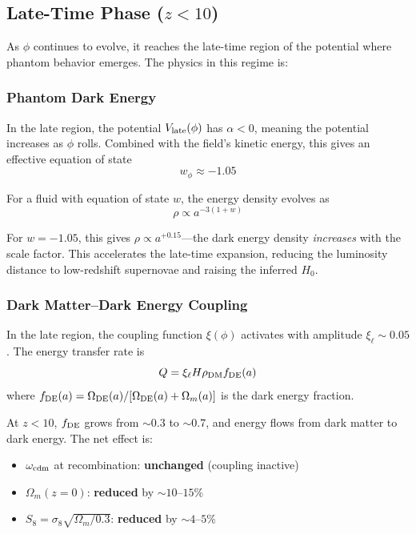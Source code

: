 \documentclass[twocolumn,showpacs,preprintnumbers,amsmath,amssymb,prd]{revtex4-2}
\begin{document}
\subsection{Late-Time Phase ($z < 10$)}

As $\phi$ continues to evolve, it reaches the late-time region of the potential where phantom behavior emerges. The physics in this regime is:

\subsubsection{Phantom Dark Energy}

In the late region, the potential $V_{\rm late}(\phi)$ has $\alpha < 0$, meaning the potential increases as $\phi$ rolls. Combined with the field's kinetic energy, this gives an effective equation of state
\begin{equation}
w_\phi \approx -1.05
\end{equation}

For a fluid with equation of state $w$, the energy density evolves as
\begin{equation}
\rho \propto a^{-3(1+w)}
\end{equation}

For $w = -1.05$, this gives $\rho \propto a^{+0.15}$---the dark energy density \textit{increases} with the scale factor. This accelerates the late-time expansion, reducing the luminosity distance to low-redshift supernovae and raising the inferred $H_0$.

\subsubsection{Dark Matter--Dark Energy Coupling}

In the late region, the coupling function $\xi(\phi)$ activates with amplitude $\xi_\ell \sim 0.05$. The energy transfer rate is
\begin{equation}
Q = \xi_\ell H \rho_{\rm DM} f_{\rm DE}(a)
\end{equation}
where $f_{\rm DE}(a) = \Omega_{\rm DE}(a)/[\Omega_{\rm DE}(a) + \Omega_m(a)]$ is the dark energy fraction.

At $z < 10$, $f_{\rm DE}$ grows from $\sim 0.3$ to $\sim 0.7$, and energy flows from dark matter to dark energy. The net effect is:
\begin{itemize}
    \item $\omega_{\rm cdm}$ at recombination: \textbf{unchanged} (coupling inactive)
    \item $\Omega_m(z=0)$: \textbf{reduced} by $\sim 10$--$15\%$
    \item $S_8 = \sigma_8\sqrt{\Omega_m/0.3}$: \textbf{reduced} by $\sim 4$--$5\%$
\end{itemize}
\end{document}

